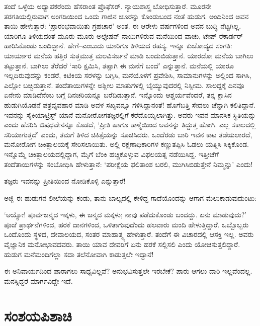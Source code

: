 ತಂದೆ ಒಳ್ಳೆಯ ಅಧ್ಯಾಪಕರೆಂದು ಹೆಸರಾಂತ ಪ್ರೊಫೆಸರ್. ನ್ಯಾಯಶಾಸ್ತ್ರ ಬೋಧಿಸುತ್ತಾರೆ. ಮೂರನೇ ತರಗತಿಯಲ್ಲಿರುವಾಗ ಅಂಗಡಿಯಿಂದ ಒಂದು ಗಾಜಿನ ಚೂರನ್ನು ಕೊಂಡುಬಂದ ನಂತೆ ಹುಡುಗ. ಅಂದಿನಿಂದ ಅವನ ತಾಯಿ ಹೇಳುತ್ತಾರೆ: ‘ಪ್ರಾರಂಭವಾಯಿತು ಗ್ರಹಚಾರ’ ಅಂತ. ಈ ಆರೇಳು ವರ್ಷಗಳಿಂದ ಅವನ ಬುದ್ಧಿ ನೆಟ್ಟಗಿಲ್ಲ. ಯಾರಿಗೂ ತಿಳಿಯದಂತೆ ಮೂರು ಮೂರು ಅಲ್ಸೇಷನ್ ನಾಯಿಗಳಿರುವ ಮನೆಯಿಂದ ವಾಚು, ಟೇಪ್ ರೆಕಾರ್ಡರ್ ಹಾರಿಸಿಕೊಂಡು ಬಂದಿದ್ದಾನೆ. ಹೇಗೆ–ಎಂಬುದು ಯಾರಿಗೂ ತಿಳಿಯದ ರಹಸ್ಯ. ಇನ್ನೂ ಕುಚೋದ್ಯದ ಸಂಗತಿ: ಯಾರ್ಯಾರ ಮನೆಯ ಹತ್ತಿರ ಸುತ್ತಮುತ್ತ ಮಲವಿಸರ್ಜನೆ ಮಾಡಿ ಬಂದುಬಿಡುತ್ತಾನೆ. ಯಾರದೋ ಮನೆಯ ಬಾಗಿಲು ತಟ್ಟುತ್ತಾನೆ. ಬಾಗಿಲು ತೆರೆದರೆ ‘ಸಾರಿ ಕ್ಷಮಿಸಿ, ತಪ್ಪಾಗಿ ಈ ಮನೆಗೆ ಬಂದೆ’ ಎನ್ನುತ್ತಾನೆ. ಮನೆಯಲ್ಲಿ ಯಾರೂ ಇಲ್ಲದಿರುವುದನ್ನು ಕಂಡರೆ, ಕಿಟಿಕಿಯ ಸರಳನ್ನು ಬಗ್ಗಿಸಿ, ಮನೆಯೊಳಗೆ ಪ್ರವೇಶಿಸಿ, ಸಾಮಾನುಗಳನ್ನು ಅಲ್ಲಿಂದ ಸಾಗಿಸಿ, ಎಲ್ಲೋ ಬಚ್ಚಿಡುತ್ತಾನೆ. ತಂದೆತಾಯಿಗಳನ್ನೇ ಅಶ್ಲೀಲ ಮಾತುಗಳಲ್ಲಿ ಬೈಯ್ಯುವುದರಲ್ಲಿ ನಿಸ್ಸೀಮ. ಸಾಲದ್ದಕ್ಕೆ ದಿನವೂ ಏನೇನು ಮಾಡಿದೆನೆಂಬ ಬಗ್ಗೆ ದಿನಚರಿಯನ್ನೂ ಬರೆದಿಡುತ್ತಾನೆ. ಇನ್ನೊಂದು ಆಶ್ಚರ್ಯವೆಂದರೆ, ತನ್ನ ಕ್ಲಾಸಿನ ಹುಡುಗಿಯೊಡನೆ ಪತ್ರವ್ಯವಹಾರ ಮಾಡಿ ಅವಳ ಸಖ್ಯವನ್ನೂ ಗಳಿಸಿದ್ದಾನಂತೆ! ಹೊಗೆಬತ್ತಿ ಸೇದಲು ಚೆನ್ನಾಗಿ ಕಲಿತಿದ್ದಾನೆ. ಇವನನ್ನು ಸೈಕಿಯಾಟ್ರಿಸ್ಟ್ ಯಾನೆ ಮನೋರೋಗತಜ್ಞರಲ್ಲಿಗೆ ಕರೆದೊಯ್ಯಲಾಗಿತ್ತು. ಅವರು ಇವನ ಮಾನಸಿಕ ಸ್ಥಿತಿಯನ್ನು  ಎಂದು ಹೆಸರಿಸಿ ಔಷಧವೇನನ್ನೂ ಕೊಡದೆ, ‘ಪ್ರೀತಿ ಹಾಗೂ ತಾಳ್ಮೆಯಿಂದ ಅವನನ್ನು ತಿದ್ದುತ್ತ ಹೋಗಿ. ಎಲ್ಲ ಸಕಾಲದಲ್ಲಿ ಸರಿಯಾಗುತ್ತದೆ’ ಎಂದು, ತಮಗೆ ತಿಳಿದ ಚಿಕಿತ್ಸೆಯನ್ನು ಸೂಚಿಸಿದರು. ಒಂದೆರಡು ಬಾರಿ ಇವನ ಕಾಟ ತಡೆಯಲಾರದೆ, ಮನೋರೋಗ ಚಿಕಿತ್ಸಾಲಯಕ್ಕೆ ಸೇರಿಸಲಾಯಿತು. ಅಲ್ಲಿ ರಕ್ಷಣಾಧಿಕಾರಿಗಳ ಕಣ್ಣುತಪ್ಪಿಸಿ ಓಡಲು ಯತ್ನಿಸಿ ಸಿಕ್ಕಿಕೊಂಡ. ಇನ್ನೊಮ್ಮೆ ಚಿಕಿತ್ಸಾಲಯದಲ್ಲಿದ್ದಾಗ, ಮೈಗೆ ಬೆಂಕಿ ಹಚ್ಚಿಕೊಳ್ಳುವ ವಿಫಲಯತ್ನ ನಡೆಯಿಸಿದ್ದ. ಇತ್ತೀಚೆಗೆ ತಂದೆತಾಯಿಗಳನ್ನು ಸಂಬೋಧಿಸಿ ಹೇಳುತ್ತಾನೆ: ‘ಪರೀಕ್ಷೆಯ ಫಲಿತಾಂಶ ಬರಲಿ, ಮುಗಿಸಿಬಿಡುತ್ತೇನೆ ನಿಮ್ಮನ್ನು’ ಎಂದು!

ತಜ್ಞರು ಇವನನ್ನು ಪ್ರೀತಿಯಿಂದ ನೋಡಿಕೊಳ್ಳಿ ಎನ್ನುತ್ತಾರೆ!

ಅಜ್ಜಿ ಈ ಹುಡುಗನ ಲೀಲೆಯನ್ನು ಕಂಡು, ತಾನು ಬಾಲ್ಯದಲ್ಲಿ ಕೇಳಿದ್ದ ಗಾದೆಯೊಂದನ್ನು ಆಗಾಗ ಮೆಲುಕಾಡುವುದುಂಟು:

‘ಅಯ್ಯೋ! ಪೂರ್ವಜನ್ಮದ ಇಕ್ಕಳು, ಈ ಜನ್ಮದ ಮಕ್ಕಳು; ನಾವು ಪಡೆದುಕೊಂಡು ಬಂದದ್ದು. ಏನು ಮಾಡುವುದು?’ ಪೂಜೆ ಪ್ರಾರ್ಥನೆಗಳಿಂದ, ಹರಕೆ ದಾನಗಳಿಂದ, ಒಳಿತಾಗುವುದೆಂದು ಹಲವಾರು ಮಂದಿ ಹೇಳುತ್ತಿದ್ದಾರೆ. ಒಬ್ಬೊಬ್ಬರು ಒಂದೊಂದು ಸ್ಥಳದ, ದೇವಾಲಯದ, ಸಂತರ ಮಾಹಾತ್ಮ್ಯ ಹೇಳುತ್ತಾರೆ. ತಂದೆಗೆ ಈ ವಿಚಾರದಲ್ಲಿ ಆಸಕ್ತಿ ಇಲ್ಲ. ಅವರು ವೈಜ್ಞಾನಿಕ ಮನೋಭಾವದವರು. ತಾಯಿ ಯಾವ ದೇವರಿಗೆ ಏನು ಹರಕೆ ಸಲ್ಲಿಸಲಿ ಎಂದು ಯೋಚಿಸುತ್ತ\-ಲಿದ್ದಾರೆ. ಹುಡುಗ ಮನೆಮಂದಿಗೆಲ್ಲಾ ಸದಾ ತಲೆನೋವಾಗಿ ಕಾಡುತ್ತಲೇ ಇದ್ದಾನೆ!

ಈ ಅನಿವಾರ್ಯದಿಂದ ಪಾರಾಗಲು ಸಾಧ್ಯವಿಲ್ಲವೆ? ಅನುಭವಿಸುತ್ತಲೇ ಇರಬೇಕೆ? ಪಾರು ಆಗಲು ದಾರಿ ಇಲ್ಲವೆಂದಲ್ಲ. ಮನಸ್ಸಿದ್ದರೆ ಮಾರ್ಗವಿದ್ದೇ ಇದೆ.


\section*{ಸಂಶಯಪಿಶಾಚಿ}

